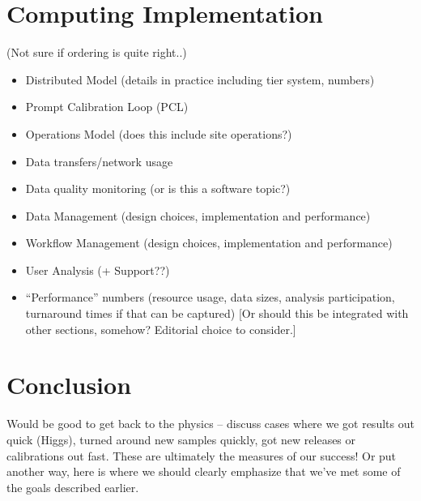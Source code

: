 \documentclass [draft,notitlepage] {article}
\begin{document}
\section{Computing Implementation} 
(Not sure if ordering is quite right..)
\begin{itemize}
\item Distributed Model (details in practice including tier system, numbers)
\item Prompt Calibration Loop (PCL)
\item Operations Model (does this include site operations?)
\item Data transfers/network usage
\item Data quality monitoring (or is this a software topic?)
\item Data Management (design choices, implementation and performance)
\item Workflow Management (design choices, implementation and performance)
\item User Analysis (+ Support??)
\item ``Performance'' numbers (resource usage, data sizes, analysis participation, turnaround times if that can be captured) [Or should this be integrated with other sections, somehow?  Editorial choice to consider.]
\end{itemize}


\section{Conclusion}
Would be good to get back to the physics -- discuss cases where we got results out quick (Higgs), turned around new samples quickly, got new releases or calibrations out fast.  These are ultimately the measures of our success!  Or put another way, here is where we should clearly emphasize that we’ve met some of the goals described earlier.




\newpage


\end{document}
